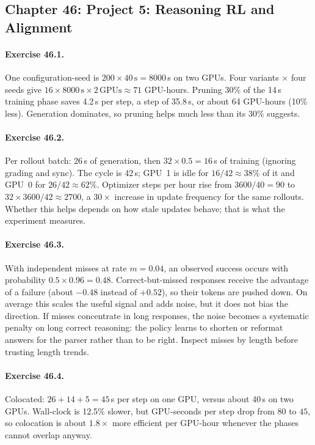\subsection*{Chapter 46: Project 5: Reasoning RL and Alignment}

\paragraph{Exercise 46.1.} One configuration-seed is $200\times40\,\text{s}=8000$\,s on two GPUs.
Four variants $\times$ four seeds give $16\times8000\,\text{s}\times2\,\text{GPUs}\approx71$
GPU-hours. Pruning 30\% of the 14\,s training phase saves 4.2\,s per step, a step of 35.8\,s, or
about 64 GPU-hours (10\% less). Generation dominates, so pruning helps much less than its 30\%
suggests.

\paragraph{Exercise 46.2.} Per rollout batch: 26\,s of generation, then $32\times0.5=16$\,s of
training (ignoring grading and sync). The cycle is 42\,s; GPU~1 is idle for $16/42\approx38\%$ of it
and GPU~0 for $26/42\approx62\%$. Optimizer steps per hour rise from $3600/40=90$ to
$32\times3600/42\approx2700$, a $30\times$ increase in update frequency for the same rollouts. Whether
this helps depends on how stale updates behave; that is what the experiment measures.

\paragraph{Exercise 46.3.} With independent misses at rate $m=0.04$, an observed success occurs with
probability $0.5\times0.96=0.48$. Correct-but-missed responses receive the advantage of a failure
(about $-0.48$ instead of $+0.52$), so their tokens are pushed down. On average this scales the
useful signal and adds noise, but it does not bias the direction. If misses concentrate in long
responses, the noise becomes a systematic penalty on long correct reasoning: the policy learns to
shorten or reformat answers for the parser rather than to be right. Inspect misses by length before
trusting length trends.

\paragraph{Exercise 46.4.} Colocated: $26+14+5=45$\,s per step on one GPU, versus about 40\,s on two
GPUs. Wall-clock is 12.5\% slower, but GPU-seconds per step drop from $80$ to $45$, so colocation is
about $1.8\times$ more efficient per GPU-hour whenever the phases cannot overlap anyway.


